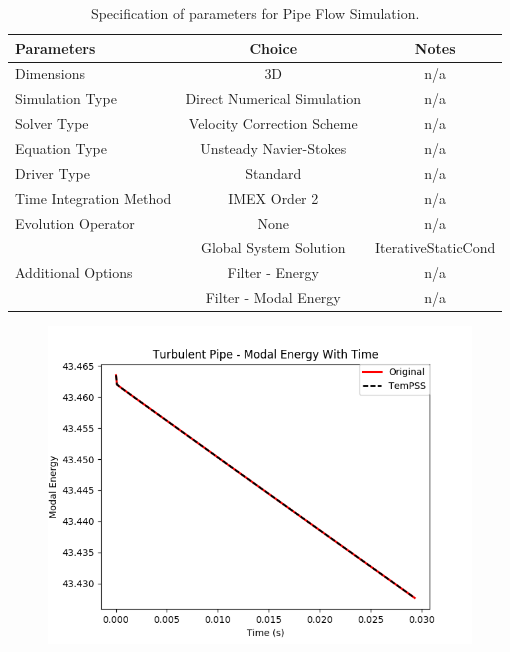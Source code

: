\documentclass[11pt, a4paper]{report}
\begin{document}
\begin{table}[htb!]
	\centering
    \begin{tabular}{ l || c c}
    \hline
    Parameters & Choice & Notes \\
    \hline
    Dimensions & 3D & n/a\\
    Simulation Type & Direct Numerical Simulation & n/a\\
    Solver Type & Velocity Correction Scheme & n/a\\
    Equation Type & Unsteady Navier-Stokes & n/a\\
    Driver Type & Standard & n/a\\
    Time Integration Method & IMEX Order 2 & n/a\\
    Evolution Operator & None & n/a\\   \hline
	 & Global System Solution & IterativeStaticCond\\
	Additional Options& Filter - Energy & n/a\\
	& Filter - Modal Energy & n/a\\
    \hline
    \end{tabular}
    \caption{Specification of parameters for Pipe Flow Simulation.}
    \label{tab:pipe_parameters}
\end{table}

\begin{figure}[htb!]
 \centering
 \includegraphics[width=.95\linewidth,  clip=true, trim = 0cm 0cm 0cm 0cm]{pipe_modal}
 \label{fig:pipe_modal}
\end{figure}

\end{document}
